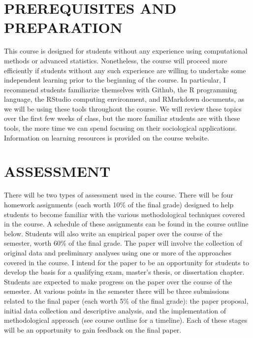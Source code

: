 \documentclass[
  10pt,
]{article}
\begin{document}
\hypertarget{prerequisites-and-preparation}{%
\section{PREREQUISITES AND
PREPARATION}\label{prerequisites-and-preparation}}

This course is designed for students without any experience using
computational methods or advanced statistics. Nonetheless, the course
will proceed more efficiently if students without any such experience
are willing to undertake some independent learning prior to the
beginning of the course. In particular, I recommend students familiarize
themselves with Github, the R programming language, the RStudio
computing environment, and RMarkdown documents, as we will be using
these tools throughout the course. We will review these topics over the
first few weeks of class, but the more familiar students are with these
tools, the more time we can spend focusing on their sociological
applications. Information on learning resources is provided on the
course website.

\hypertarget{assessment}{%
\section{ASSESSMENT}\label{assessment}}

There will be two types of assessment used in the course. There will be
four homework assignments (each worth 10\% of the final grade) designed
to help students to become familiar with the various methodological
techniques covered in the course. A schedule of these assignments can be
found in the course outline below. Students will also write an empirical
paper over the course of the semester, worth 60\% of the final grade.
The paper will involve the collection of original data and preliminary
analyses using one or more of the approaches covered in the course. I
intend for the paper to be an opportunity for students to develop the
basis for a qualifying exam, master's thesis, or dissertation chapter.
Students are expected to make progress on the paper over the course of
the semester. At various points in the semester there will be three
submissions related to the final paper (each worth 5\% of the final
grade): the paper proposal, initial data collection and descriptive
analysis, and the implementation of methodological approach (see course
outline for a timeline). Each of these stages will be an opportunity to
gain feedback on the final paper.
\end{document}
